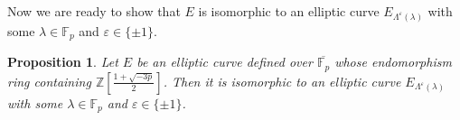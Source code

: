 \documentclass[a4paper, 11pt]{article}
\theoremstyle{plain}
\newtheorem{prop}[defn]{Proposition}
\newcommand{\?}{\textcolor{red}{??}}
\newcommand{\lm}{\lambda}
\newcommand{\Lm}{\Lambda}
\newcommand{\fp}{\mathbb{F}_p}
\newcommand{\fpp}{\mathbb{F}_{p^2}}
\newcommand{\bZ}{\mathbb{Z}}
\begin{document}
Now we are ready to show that $E$ is isomorphic to an elliptic curve $E_{\Lm^{\varepsilon}(\lm)}$ with some $\lm \in \fp$ and $\varepsilon\in\{\pm1\}$.



\begin{prop}
\label{lamdadekakeruyo}
    Let $E$ be an elliptic curve defined over $\overline{\fp}$ whose endomorphism ring containing $\bZ \left[ \frac{1+\sqrt{-3p}}{2}\right]$. Then it is isomorphic to an elliptic curve $E_{\Lm^{\varepsilon}(\lm)}$ with some $\lm \in \fp$ and $\varepsilon\in \{\pm1\}$.
\end{prop}
\end{document}
